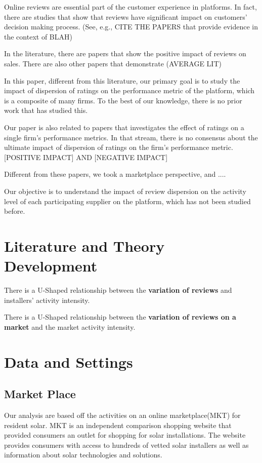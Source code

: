 \documentclass[mnsc,blindrev]{informs3} %
\begin{document}
Online reviews are essential part of the customer experience in platforms. In fact, there are studies that show that reviews have significant impact on customers'  decision making process.  (See, e.g., CITE THE PAPERS  that provide evidence in the context of  BLAH)


In the literature, there are papers that show the positive impact of reviews on sales. There are also other papers that demonstrate  (AVERAGE LIT)

In this paper, different from this literature, our primary goal is to study the impact of dispersion of ratings on the  performance metric of the platform, which is a composite of many firms. To the best of our knowledge, there is no prior work that has studied this. 

Our paper is also related to papers that investigates the effect of ratings on a single firm's performance metrics. In that stream, there is no consensus about the ultimate impact of dispersion of ratings on the firm's performance metric. [POSITIVE IMPACT]  AND [NEGATIVE IMPACT]

Different from these papers, we took a marketplace perspective, and ....

Our objective is to understand the impact of review dispersion on the activity level of each participating supplier on the platform, which has not been studied before.



\section{Literature and Theory Development }
 \begin{hypothesis}
There is a U-Shaped relationship between the \textbf{variation of reviews} and installers' activity intensity. 
\end{hypothesis}

 \begin{hypothesis}
There is a U-Shaped relationship between the \textbf{variation of reviews on a market} and the market activity intensity. 
\end{hypothesis}
\section{Data and Settings}
\subsection{Market Place}
Our analysis are based off the activities on an online marketplace(MKT) for resident solar. MKT is an independent comparison shopping website that provided consumers an outlet for shopping for solar installations. The website provides consumers with access to hundreds of vetted solar installers as well as information about solar technologies and solutions. 
\end{document}
